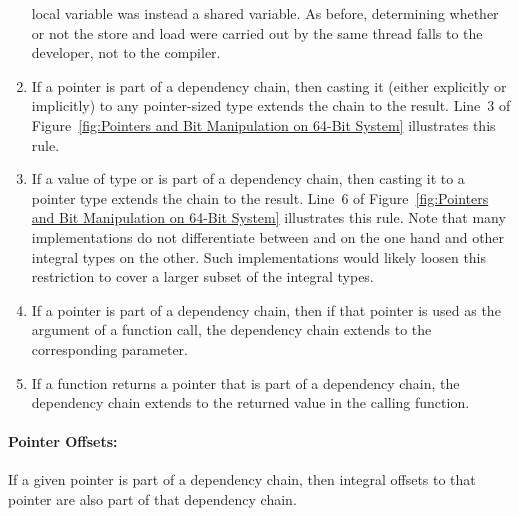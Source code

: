 \documentclass[letterpaper,twocolumn,10pt]{article}
\begin{document}
\begin{enumerate}
	local variable  was instead a shared variable.
	As before, determining whether or not the store and load were
	carried out by the same thread falls to the developer, not
	to the compiler.
\item	If a pointer is part of a dependency chain, then casting it
	(either explicitly or implicitly) to any pointer-sized type
	extends the chain to the result.
	Line~3 of
	Figure~\ref{fig:Pointers and Bit Manipulation on 64-Bit System}
	illustrates this rule.
\item	If a value of type  or  is part of
	a dependency chain, then casting it to a pointer type
	extends the chain to the result.
	Line~6 of
	Figure~\ref{fig:Pointers and Bit Manipulation on 64-Bit System}
	illustrates this rule.
	Note that many implementations do not differentiate between
	 and  on the one hand and other
	integral types on the other.
	Such implementations would likely loosen this restriction to
	cover a larger subset of the integral types.
\item	If a pointer is part of a dependency chain, then if that pointer
	is used as the argument of a function call, the
	dependency chain extends to the corresponding parameter.
\item	If a function returns a pointer that is part of a dependency
	chain, the dependency chain extends to the returned value in
	the calling function.
\end{enumerate}

\paragraph{Pointer Offsets:}

If a given pointer is part of a dependency chain, then integral offsets
to that pointer are also part of that dependency chain.
\end{document}
